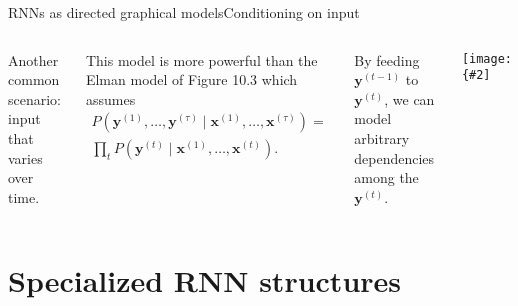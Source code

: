 \documentclass{beamer}
\renewcommand{\vec}[1]{\boldsymbol{#1}}
\newcommand{\myfig}[3]{\centerline{\texttt{[image: \{\#2]}}}
    \centerline{\scriptsize #3}}
\begin{document}
\begin{frame}{RNNs as directed graphical models}{Conditioning on input}

  \begin{columns}

    \column{2.3in}

    Another common scenario: input that varies over time.

    \medskip
  
    This model is more powerful than the Elman model of Figure 10.3
    which assumes \begin{eqnarray}
    P(\vec{y}^{(1)},\ldots,\vec{y}^{(\tau)} \mid
    \vec{x}^{(1)},\ldots,\vec{x}^{(\tau)}) = \nonumber \\
    \prod_t P(\vec{y}^{(t)} \mid
    \vec{x}^{(1)},\ldots,\vec{x}^{(t)}). \nonumber \end{eqnarray}

    \medskip

    By feeding $\vec{y}^{(t-1)}$ to $\vec{y}^{(t)}$, we can model
    arbitrary dependencies among the $\vec{y}^{(t)}$.
      
    \column{2.1in}
    
    \myfig{2.1in}{goodfellow-fig10-10}{Goodfellow, et al.\ (2016),
      Fig.\ 10.10}

  \end{columns}
  
\end{frame}

\section{Specialized RNN structures}
\end{document}
